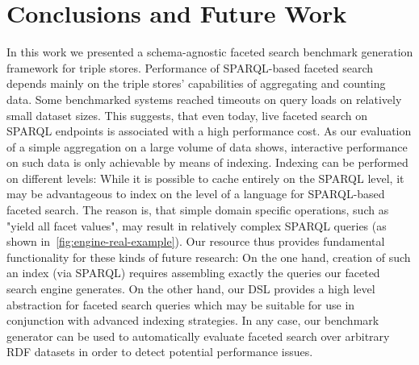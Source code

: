 \section{Conclusions and Future Work}
\label{sec:conclusions}
In this work we presented a schema-agnostic faceted search benchmark generation framework for triple stores.
Performance of SPARQL-based faceted search depends mainly on the triple stores' capabilities of aggregating and counting data. Some benchmarked systems reached timeouts on query loads on relatively small dataset sizes. This suggests, that even today, live faceted search on SPARQL endpoints is associated with a high performance cost. As our evaluation of a simple aggregation on a large volume of data shows, interactive performance on such data is only achievable by means of indexing.
Indexing can be performed on different levels: While it is possible to cache entirely on the SPARQL level, it may be advantageous to index on the level of a language for SPARQL-based faceted search. The reason is, that simple domain specific operations, such as "yield all facet values", may result in relatively complex SPARQL queries (as shown in~\autoref{fig:engine-real-example}).
Our resource thus provides fundamental functionality for these kinds of future research:
On the one hand, creation of such an index (via SPARQL) requires assembling exactly the queries our faceted search engine generates. On the other hand, our DSL provides a high level abstraction for faceted search queries which may be suitable for use in conjunction with advanced indexing strategies.
In any case, our benchmark generator can be used to automatically evaluate faceted search over arbitrary RDF datasets in order to detect potential performance issues.



